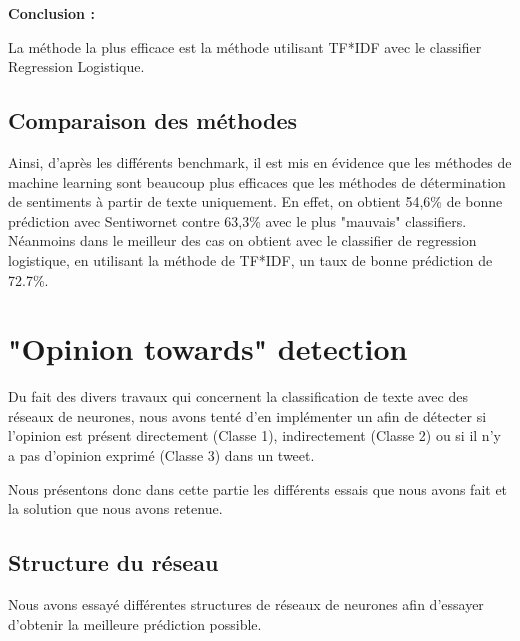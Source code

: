 \par \textbf{Conclusion :} \\
\par La méthode la plus efficace est la méthode utilisant TF*IDF avec le classifier Regression Logistique. \\


\subsection{Comparaison des méthodes}

\par Ainsi, d'après les différents benchmark, il est mis en évidence que les méthodes de machine learning sont beaucoup plus efficaces que les méthodes de détermination de sentiments à partir de texte uniquement. En effet, on obtient 54,6\% de bonne prédiction avec Sentiwornet contre 63,3\% avec le plus "mauvais" classifiers. Néanmoins dans le meilleur des cas on obtient avec le classifier de regression logistique, en utilisant la méthode de TF*IDF, un taux de bonne prédiction de 72.7\%.


\section{"Opinion towards" detection}

\par Du fait des divers travaux qui concernent la classification de texte avec des réseaux de neurones\cite{cnn}\cite{rnn}, nous avons tenté d'en implémenter un afin de détecter si l'opinion est présent directement (Classe 1), indirectement (Classe 2) ou si il n'y a pas d'opinion exprimé (Classe 3) dans un tweet.

\par Nous présentons donc dans cette partie les différents essais que nous avons fait et la solution que nous avons retenue.

\subsection{Structure du réseau}

\par Nous avons essayé différentes structures de réseaux de neurones afin d'essayer d'obtenir la meilleure prédiction possible.

